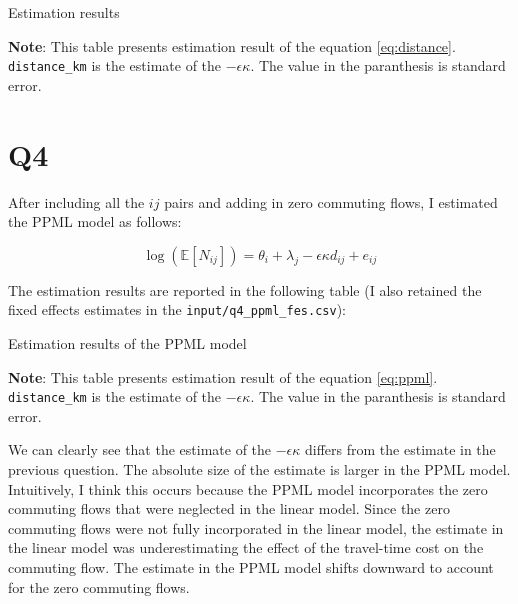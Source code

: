 \documentclass[
  11pt]{article}
\begin{document}
\begin{table}[!ht]
\centering
\caption{Estimation results}
\label{tab:est_results}

\end{table}

\footnotesize \textbf{Note}: This table presents estimation result of
the equation \ref{eq:distance}. \texttt{distance\_km} is the estimate of
the \(-\epsilon\kappa\). The value in the paranthesis is standard
error.\vspace{3em}

\normalsize

\section*{Q4}\label{q4}

After including all the \(ij\) pairs and adding in zero commuting flows,
I estimated the PPML model as follows:

\[
\log(\mathbb{E}[N_{ij}])= \theta_{i} + \lambda_{j} - \epsilon \kappa d_{ij} + e_{ij}\label{eq:ppml}
\]

The estimation results are reported in the following table (I also
retained the fixed effects estimates in the
\texttt{input/q4\_ppml\_fes.csv}):

\begin{table}[!ht]
\centering
\caption{Estimation results of the PPML model}
\label{tab:est_ppml}

\end{table}

\footnotesize \textbf{Note}: This table presents estimation result of
the equation \ref{eq:ppml}. \texttt{distance\_km} is the estimate of the
\(-\epsilon\kappa\). The value in the paranthesis is standard
error.\vspace{3em}

\normalsize

We can clearly see that the estimate of the \(-\epsilon\kappa\) differs
from the estimate in the previous question. The absolute size of the
estimate is larger in the PPML model. Intuitively, I think this occurs
because the PPML model incorporates the zero commuting flows that were
neglected in the linear model. Since the zero commuting flows were not
fully incorporated in the linear model, the estimate in the linear model
was underestimating the effect of the travel-time cost on the commuting
flow. The estimate in the PPML model shifts downward to account for the
zero commuting flows.
\end{document}
